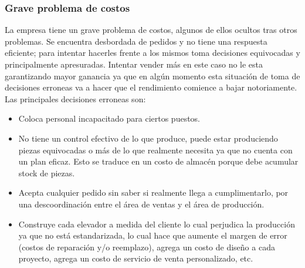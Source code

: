 \subsubsection{Grave problema de costos}
La empresa tiene un grave problema de costos, algunos de ellos ocultos tras otros problemas. Se encuentra desbordada de pedidos y no tiene una respuesta eficiente; para intentar hacerles frente a los mismos toma decisiones equivocadas y principalmente apresuradas. Intentar vender m\'as en este caso no le esta garantizando mayor ganancia ya que en alg\'un momento esta situaci\'on de toma de decisiones erroneas va a hacer que el rendimiento comience a bajar notoriamente. Las principales decisiones erroneas son:
	\begin{itemize}
 		\item Coloca personal incapacitado para ciertos puestos. 
		\item No tiene un control efectivo de lo que produce, puede estar produciendo piezas equivocadas o m\'as de lo que realmente necesita ya que no cuenta con un plan eficaz. Esto se traduce en un costo de almac\'en porque debe acumular stock de piezas.
		\item Acepta cualquier pedido sin saber si realmente llega a cumplimentarlo, por una descoordinaci\'on entre el \'area de ventas y el \'area de producci\'on.
		\item Construye cada elevador a medida del cliente lo cual perjudica la producci\'on ya que no est\'a estandarizada, lo cual hace que aumente el margen de error (costos de reparaci\'on y/o reemplazo), agrega un costo de dise\~no a cada proyecto, agrega un costo de servicio de venta personalizado, etc.
	\end{itemize}
